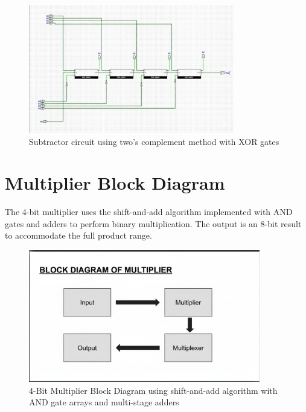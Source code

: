 \begin{figure}[h]
    \centering
    \includegraphics[width=0.8\textwidth]{subtractor}
    \caption{Subtractor circuit using two's complement method with XOR gates}
    \label{fig:subtractor}
\end{figure}

\section{Multiplier Block Diagram}

The 4-bit multiplier uses the shift-and-add algorithm implemented with AND gates and adders to perform binary multiplication. The output is an 8-bit result to accommodate the full product range.

\begin{figure}[h]
    \centering
    \includegraphics[width=0.9\textwidth]{multiplier}
    \caption{4-Bit Multiplier Block Diagram using shift-and-add algorithm with AND gate arrays and multi-stage adders}
    \label{fig:multiplier}
\end{figure}

